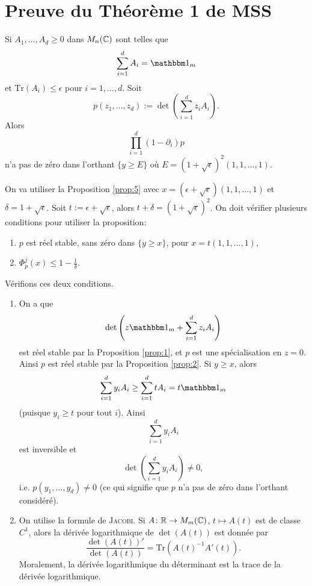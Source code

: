 \section{Preuve du Théorème 1 de MSS}
\label{sec:preuve-du-theoreme1}

\begin{prop}
  \label{prop:9}
  Si $A_1, \ldots , A_d \geq 0$ dans $M_n(\mathbb{C})$ sont telles que 
  \[ \sum_{i=1}^{d} A_i = \un_m \]
  et $\mathrm{Tr}(A_i) \leq \epsilon$ pour $i = 1, \ldots , d$. Soit 
  \[ p(z_1, \ldots , z_d) := \det \left( \sum_{i=1}^{d} z_i A_i \right). \]
  Alors 
  \[ \prod_{i=1}^{d} (1 - \partial_i)p \]
  n'a pas de zéro dans l'orthant $\{y \geq E\}$ où $E=(1 + \sqrt{\epsilon})^2(1, 1, \ldots , 1)$.
\end{prop}

\begin{preuve}
  On va utiliser la Proposition \ref{prop:5} avec $x = (\epsilon + \sqrt{\epsilon})(1, 1, \ldots , 1)$ et
  $\delta = 1 + \sqrt{\epsilon}$. Soit $t := \epsilon + \sqrt{\epsilon}$, alors $t + \delta = (1 +
  \sqrt{\epsilon})^2$. On doit vérifier plusieurs conditions pour utiliser la proposition:
  \begin{enumerate}
  \item $p$ est réel stable, sans zéro dans $\{y \geq x\}$, pour $x = t(1,1, \ldots , 1)$,
  \item $\Phi_p^j(x) \leq 1 - \frac{1}{\delta}$.
  \end{enumerate}
  Vérifions ces deux conditions.
  \begin{enumerate}
  \item On a que 
    \[ \det \left(z \un_m + \sum_{i = 1}^{d} z_i A_i \right) \]
    est réel stable par la Proposition \ref{prop:1}, et $p$ est une spécialisation en $z = 0$. Ainsi $p$ est
    réel stable par la Proposition \ref{prop:2}. Si $y \geq x$, alors 
    \[ \sum_{i=1}^{d}y_i A_i \geq \sum_{i=1}^{d} t A_i = t \un_m\]
    (puisque $y_i \geq t$ pour tout $i$). Ainsi 
    \[ \sum_{i=1}^{d}y_i A_i \]
    est inversible et 
    \[ \det \left( \sum_{i=1}^{d} y_i A_i \right) \neq 0, \]
    i.e. $p(y_1, \ldots , y_d) \neq 0$ (ce qui signifie que $p$ n'a pas de zéro dans l'orthant considéré).
    
  \item On utilise la formule de \textsc{Jacobi}. Si $A \colon \mathbb{R} \to M_m(\mathbb{C})$, $t \mapsto A(t)$ est de classe
    $C^1$, alors la dérivée logarithmique de $\det(A(t))$ est donnée par
    \[ \frac{\det(A(t))'}{\det(A(t))} = \mathrm{Tr}(A(t)^{-1}A'(t)). \]
    Moralement, la dérivée logarithmique du déterminant est la trace de la dérivée logarithmique.


\end{enumerate}
\end{preuve}
